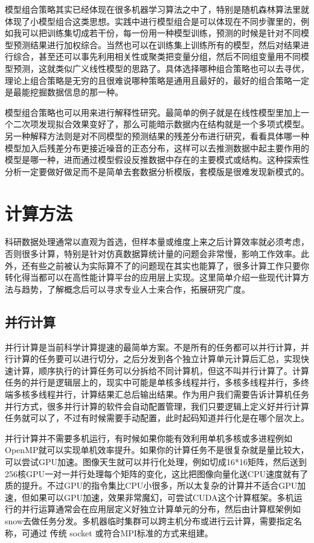 \documentclass[]{tufte-book}
\begin{document}
模型组合策略其实已经体现在很多机器学习算法之中了，特别是随机森林算法里就体现了小模型组合这类思想。实践中进行模型组合是可以体现在不同步骤里的，例如我可以把训练集切成若干份，每一份用一种模型训练，预测的时候是针对不同模型预测结果进行加权综合。当然也可以在训练集上训练所有的模型，然后对结果进行综合，甚至还可以事先利用相关性或聚类把变量分组，然后不同组变量用不同模型预测，这就类似广义线性模型的思路了。具体选择哪种组合策略也可以去寻优，理论上组合策略是无穷的且很难说哪种策略是通用且最好的，最好的组合策略一定是最能挖掘数据信息的那一种。

模型组合策略也可以用来进行解释性研究。最简单的例子就是在线性模型里加上一个二次项发现拟合效果变好了，那么可能暗示数据内在结构就是一个多项式模型。另一种解释方法则是对不同模型的预测结果的残差分布进行研究，看看具体哪一种模型加入后残差分布更接近噪音的正态分布，这样可以去推测数据中起主要作用的模型是哪一种，进而通过模型假设反推数据中存在的主要模式或结构。这种探索性分析一定要做好做足而不是简单去套数据分析模版，套模版是很难发现新模式的。

\hypertarget{ux8ba1ux7b97ux65b9ux6cd5}{%
\section{计算方法}\label{ux8ba1ux7b97ux65b9ux6cd5}}

科研数据处理通常以直观为首选，但样本量或维度上来之后计算效率就必须考虑，否则很多计算，特别是针对仿真数据算统计量的问题会非常慢，影响工作效率。此外，还有些之前被认为实际算不了的问题现在其实也能算了，很多计算工作只要你转化得当都可以在高性能计算平台的应用层上实现。这里简单介绍一些现代计算方法与趋势，了解概念后可以寻求专业人士来合作，拓展研究广度。

\hypertarget{ux5e76ux884cux8ba1ux7b97}{%
\subsection{并行计算}\label{ux5e76ux884cux8ba1ux7b97}}

并行计算是当前科学计算提速的最简单方案。不是所有的任务都可以并行计算，并行计算的任务要可以进行切分，之后分发到各个独立计算单元计算后汇总，实现快速计算，顺序执行的计算任务可以分拆给不同计算机，但这不叫并行计算了。计算任务的并行是逻辑层上的，现实中可能是单核多线程并行，多核多线程并行，多终端多核多线程并行，计算结果汇总后输出结果。作为用户我们需要告诉计算机任务并行方式，很多并行计算的软件会自动配置管理，我们只要逻辑上定义好并行计算任务就可以了，不过有时候需要手动配置，此时起码知道并行化是在哪个层次上。

并行计算并不需要多机运行，有时候如果你能有效利用单机多核或多进程例如OpenMP就可以实现单机效率提升。如果你的计算任务不是很复杂就是量比较大，可以尝试GPU加速。图像天生就可以并行化处理，例如切成16*16矩阵，然后送到256核GPU一对一并行处理每个矩阵的变化，这比把图像向量化送CPU速度就有了质的提升。不过GPU的指令集比CPU小很多，所以太复杂的计算并不适合GPU加速，但如果可以GPU加速，效果非常魔幻，可尝试CUDA这个计算框架。多机运行的并行运算通常会在应用层定义好独立计算单元的分布，然后由计算框架例如snow去做任务分发。多机器临时集群可以跨主机分布或进行云计算，需要指定名称，可通过 传统 socket 或符合MPI标准的方式来组建。
\end{document}
